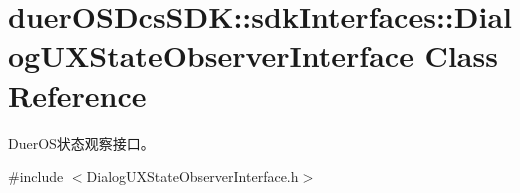 \hypertarget{classduerOSDcsSDK_1_1sdkInterfaces_1_1DialogUXStateObserverInterface}{}\section{duer\+O\+S\+Dcs\+S\+DK\+:\+:sdk\+Interfaces\+:\+:Dialog\+U\+X\+State\+Observer\+Interface Class Reference}
\label{classduerOSDcsSDK_1_1sdkInterfaces_1_1DialogUXStateObserverInterface}


Duer\+O\+S状态观察接口。  




{\ttfamily \#include $<$Dialog\+U\+X\+State\+Observer\+Interface.\+h$>$}

